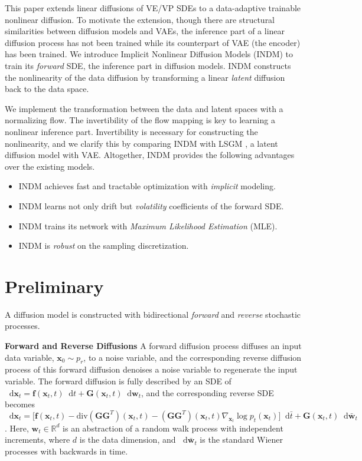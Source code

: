 \documentclass{article}
\theoremstyle{definition}
\theoremstyle{remark}
\newcommand*\diff{\mathop{}\!\mathrm{d}}
\begin{document}
	This paper extends linear diffusions of VE/VP SDEs to a data-adaptive trainable nonlinear diffusion. To motivate the extension, though there are structural similarities between diffusion models and VAEs, the inference part of a linear diffusion process has not been trained while its counterpart of VAE (the encoder) has been trained. We introduce Implicit Nonlinear Diffusion Models (INDM) to train its \textit{forward} SDE, the inference part in diffusion models. INDM constructs the nonlinearity of the data diffusion by transforming a linear \textit{latent} diffusion back to the data space.
	
	We implement the transformation between the data and latent spaces with a normalizing flow. The invertibility of the flow mapping is key to learning a nonlinear inference part. Invertibility is necessary for constructing the nonlinearity, and we clarify this by comparing INDM with LSGM \cite{vahdat2021score}, a latent diffusion model with VAE. Altogether, INDM provides the following advantages over the existing models.
	\vspace{-2mm}
	\begin{itemize}\setlength\itemsep{0.2em}
	\item INDM achieves fast and tractable optimization with \textit{implicit} modeling.
	\item INDM learns not only drift but \textit{volatility} coefficients of the forward SDE.
	\item INDM trains its network with \textit{Maximum Likelihood Estimation} (MLE).
	\item INDM is \textit{robust} on the sampling discretization.
	\end{itemize}
	\vspace{-2mm}
	
	\section{Preliminary}\label{preliminary}
	
	A diffusion model is constructed with bidirectional \textit{forward} and \textit{reverse} stochastic processes. 
	
	\textbf{Forward and Reverse Diffusions} A forward diffusion process diffuses an input data variable, $\mathbf{x}_{0}\sim p_{r}$, to a noise variable, and the corresponding reverse diffusion process \cite{anderson1982reverse} of this forward diffusion denoises a noise variable to regenerate the input variable. The forward diffusion is fully described by an SDE of $\diff\mathbf{x}_{t}=\mathbf{f}(\mathbf{x}_{t},t)\diff t+\mathbf{G}(\mathbf{x}_{t},t)\diff\mathbf{w}_{t}$, and the corresponding reverse SDE becomes $\diff\mathbf{x}_{t}=\big[\mathbf{f}(\mathbf{x}_{t},t)-\text{div}(\mathbf{G}\mathbf{G}^{T})(\mathbf{x}_{t},t)-(\mathbf{G}\mathbf{G}^{T})(\mathbf{x}_{t},t)\nabla_{\mathbf{x}_{t}}\log{p_{t}(\mathbf{x}_{t})}\big]\diff \bar{t}+\mathbf{G}(\mathbf{x}_{t},t)\diff\mathbf{\bar{w}}_{t}$. Here, $\mathbf{w}_{t}\in\mathbb{R}^{d}$ is an abstraction of a random walk process with independent increments, where $d$ is the data dimension, and $\diff\mathbf{\bar{w}}_{t}$ is the standard Wiener processes with backwards in time. 
	
\end{document}
